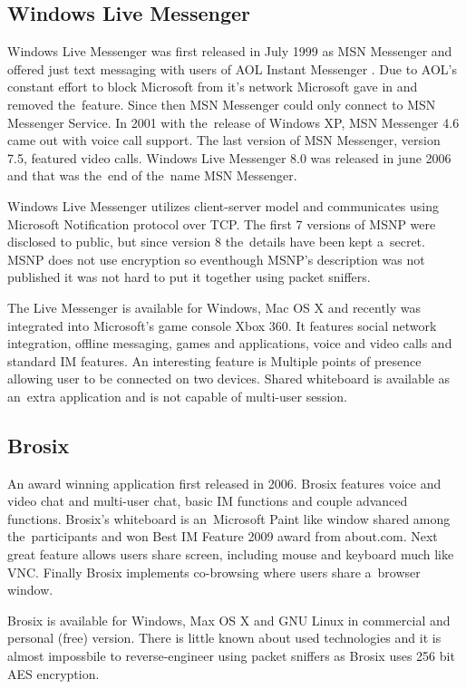 \subsection*{Windows Live Messenger}
Windows Live Messenger was first released in July 1999 as MSN Messenger and offered just text messaging with users of AOL Instant Messenger \cite{AIM}. Due to AOL's constant effort to block Microsoft from it's network Microsoft gave in and removed the~feature. Since then MSN Messenger could only connect to MSN Messenger Service. In 2001 with the~release of Windows XP, MSN Messenger 4.6 came out with voice call support. The last version of MSN Messenger, version 7.5, featured video calls. Windows Live Messenger 8.0 was released in june 2006 and that was the~end of the~name MSN Messenger.   

Windows Live Messenger utilizes client-server model and communicates using Microsoft Notification protocol over TCP. The first 7 versions of MSNP were disclosed to public, but since version 8 the~details have been kept a~secret. MSNP does not use encryption so eventhough MSNP's description was not published it was not hard to put it together using packet sniffers.

The Live Messenger is available for Windows, Mac OS X and recently was integrated into Microsoft's game console Xbox 360. It features social network integration, offline messaging, games and applications, voice and video calls and standard IM features. An interesting feature is Multiple points of presence allowing user to be connected on two devices. Shared whiteboard is available as an~extra application and is not capable of multi-user session.   

\subsection*{Brosix}
An award winning application first released in 2006. Brosix features voice and video chat and multi-user chat, basic IM functions and couple advanced functions. Brosix's whiteboard is an~Microsoft Paint like window shared among the~participants and won Best IM Feature 2009 award from about.com. Next great feature allows users share screen, including mouse and keyboard much like VNC. Finally Brosix implements co-browsing where users share a~browser window. 

Brosix is available for Windows, Max OS X and GNU Linux in commercial and personal (free) version. There is little known about used technologies and it is almost impossbile to reverse-engineer using packet sniffers as Brosix uses 256 bit AES encryption.

